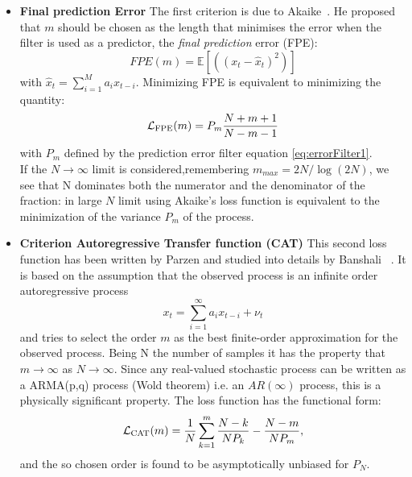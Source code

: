 \documentclass[twocolumn,showpacs,preprintnumbers,nofootinbib,prd,
superscriptaddress,10pt]{revtex4-1}
\begin{document}
\begin{itemize}
\item \textbf{Final prediction Error } 
The first criterion is due to Akaike~\cite{Akaike1970StatisticalPI}. He proposed that $m$ should be chosen as the 
length that minimises the error when the filter is used as a predictor, the \emph{final prediction} error (FPE): 
\begin{equation}
    FPE(m) = \mathbb{E}\left[ \left((x_t - \hat x_t) ^ 2\right) \right]
\end{equation}
with $\hat{x}_t = \sum_{i = 1}^M a_i x_{t - i}$.
Minimizing FPE is equivalent to minimizing the quantity: 
\begin{equation}
    \mathcal{L}_{\rm FPE}(m) = P_{m} \frac{N + m + 1}{N - m - 1}
\end{equation}
with $P_m$ defined by the prediction error filter equation \ref{eq:errorFilter1}. \\ 
If the $N \to \infty$ limit is considered,remembering $m_{max} = 2N / \log(2N)$, we see that N dominates both the numerator and the denominator of the fraction: in large $N$ limit using Akaike's loss function is equivalent to the minimization of the variance $P_m$ of the process. 

\item \textbf{Criterion Autoregressive Transfer function (CAT)}
This second loss function has been written by Parzen and studied into details by Banshali ~\cite{bhansali1986}. 
It is based on the assumption that the observed process is an infinite order autoregressive process 
\begin{equation} 
x_t = \sum_{i = 1}^{\infty}a_{i}x_{t-i} + \nu_t
\end{equation} 
and tries to select the order $m$ as the best finite-order approximation for the observed process. Being N the number of samples it has the property that $m \to \infty$ as $N \to \infty$. Since any real-valued stochastic process can be written as a ARMA(p,q) process (Wold theorem) i.e. an $AR(\infty)$ process, this is a physically significant property. 
The loss function has the functional form: 
\begin{equation}
    \mathcal{L}_{\rm CAT}(m) = \frac{1}{N}\sum_{k = 1}^m \frac{N - k}{N P_k} - \frac{N - m}{N P_m},
\end{equation}
and the so chosen order is found to be asymptotically unbiased for $P_N$. 


\end{itemize}
\end{document}
